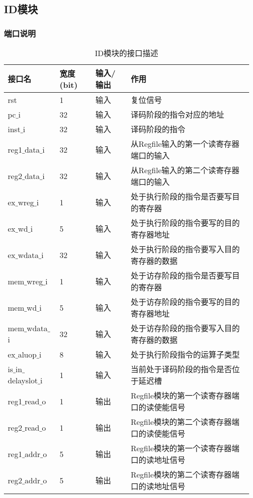 \subsection{ID模块}
\subsubsection{端口说明}
\begin{table}[H]
	\centering
	\caption{ID模块的接口描述}
	\begin{tabular}{|l|l|l|l|}
		\hline
		接口名 & 宽度(bit) & 输入/输出 & 作用 \\
		\hline
		rst & 1 & 输入 & 复位信号 \\
		\hline
		pc$\_$i & 32 & 输入 & 译码阶段的指令对应的地址 \\
		\hline
		inst$\_$i & 32 & 输入 & 译码阶段的指令 \\
		\hline
		reg1$\_$data$\_$i & 32 & 输入 & 从Regfile输入的第一个读寄存器端口的输入 \\
		\hline
		reg2$\_$data$\_$i & 32 & 输入 & 从Regfile输入的第二个读寄存器端口的输入 \\
		\hline
		ex$\_$wreg$\_$i & 1 & 输入 & 处于执行阶段的指令是否要写目的寄存器 \\
		\hline
		ex$\_$wd$\_$i & 5 & 输入 & 处于执行阶段的指令要写的目的寄存器地址 \\
		\hline
		ex$\_$wdata$\_$i & 32 & 输入 & 处于执行阶段的指令要写入目的寄存器的数据 \\
		\hline
		mem$\_$wreg$\_$i & 1 & 输入 & 处于访存阶段的指令是否要写目的寄存器 \\
		\hline
		mem$\_$wd$\_$i & 5 & 输入 & 处于访存阶段的指令要写的目的寄存器地址 \\
		\hline
		mem$\_$wdata$\_$i & 32 & 输入 & 处于访存阶段的指令要写入目的寄存器的数据 \\
		\hline
		ex$\_$aluop$\_$i & 8 & 输入 & 处于执行阶段指令的运算子类型 \\
		\hline
		is$\_$in$\_$delayslot$\_$i & 1 & 输入 & 当前处于译码阶段的指令是否位于延迟槽 \\
		\hline
		reg1$\_$read$\_$o & 1 & 输出 & Regfile模块的第一个读寄存器端口的读使能信号 \\
		\hline
		reg2$\_$read$\_$o & 1 & 输出 & Regfile模块的第二个读寄存器端口的读使能信号 \\
		\hline
		reg1$\_$addr$\_$o & 5 & 输出 & Regfile模块的第一个读寄存器端口的读地址信号 \\
		\hline
		reg2$\_$addr$\_$o & 5 & 输出 & Regfile模块的第二个读寄存器端口的读地址信号 \\

\end{tabular}
\end{table}
